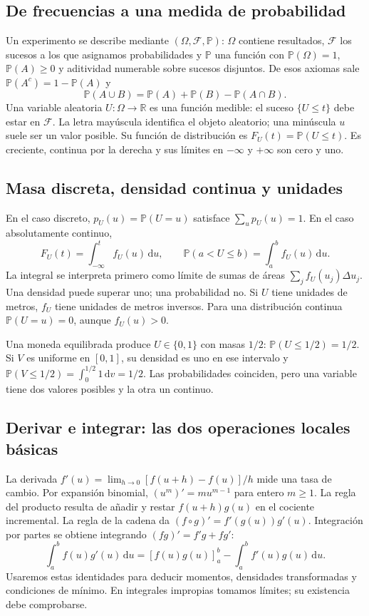 \documentclass[11pt,a4paper]{article}
\newcommand{\R}{\mathbb R}
\newcommand{\Prob}{\mathbb P}
\newcommand{\dd}{\,\mathrm d}
\theoremstyle{definition}
\begin{document}
\subsection{De frecuencias a una medida de probabilidad}
Un experimento se describe mediante $(\Omega,\mathcal F,\Prob)$: $\Omega$ contiene resultados, $\mathcal F$ los sucesos a los que asignamos probabilidades y $\Prob$ una función con $\Prob(\Omega)=1$, $\Prob(A)\ge0$ y aditividad numerable sobre sucesos disjuntos. De esos axiomas sale $\Prob(A^c)=1-\Prob(A)$ y
\[
\Prob(A\cup B)=\Prob(A)+\Prob(B)-\Prob(A\cap B).
\]
Una variable aleatoria $U:\Omega\to\R$ es una función medible: el suceso $\{U\le t\}$ debe estar en $\mathcal F$. La letra mayúscula identifica el objeto aleatorio; una minúscula $u$ suele ser un valor posible. Su función de distribución es $F_U(t)=\Prob(U\le t)$. Es creciente, continua por la derecha y sus límites en $-\infty$ y $+\infty$ son cero y uno.
\subsection{Masa discreta, densidad continua y unidades}
En el caso discreto, $p_U(u)=\Prob(U=u)$ satisface $\sum_u p_U(u)=1$. En el caso absolutamente continuo,
\[
F_U(t)=\int_{-\infty}^{t}f_U(u)\dd u,\qquad
\Prob(a<U\le b)=\int_a^b f_U(u)\dd u.
\]
La integral se interpreta primero como límite de sumas de áreas $\sum_j f_U(u_j)\Delta u_j$. Una densidad puede superar uno; una probabilidad no. Si $U$ tiene unidades de metros, $f_U$ tiene unidades de metros inversos. Para una distribución continua $\Prob(U=u)=0$, aunque $f_U(u)>0$.
\begin{ejemplo}
Una moneda equilibrada produce $U\in\{0,1\}$ con masas $1/2$: $\Prob(U\le1/2)=1/2$. Si $V$ es uniforme en $[0,1]$, su densidad es uno en ese intervalo y $\Prob(V\le1/2)=\int_0^{1/2}1\dd v=1/2$. Las probabilidades coinciden, pero una variable tiene dos valores posibles y la otra un continuo.
\end{ejemplo}
\subsection{Derivar e integrar: las dos operaciones locales básicas}
La derivada $f'(u)=\lim_{h\to0}[f(u+h)-f(u)]/h$ mide una tasa de cambio. Por expansión binomial, $(u^m)'=mu^{m-1}$ para entero $m\ge1$. La regla del producto resulta de añadir y restar $f(u+h)g(u)$ en el cociente incremental. La regla de la cadena da $(f\circ g)'=f'(g(u))g'(u)$. Integración por partes se obtiene integrando $(fg)'=f'g+fg'$:
\[
\int_a^b f(u)g'(u)\dd u=[f(u)g(u)]_a^b-\int_a^b f'(u)g(u)\dd u.
\]
Usaremos estas identidades para deducir momentos, densidades transformadas y condiciones de mínimo. En integrales impropias tomamos límites; su existencia debe comprobarse.
\end{document}
